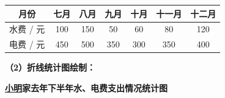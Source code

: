 \vspace{0.2cm}
\begin{center}
\renewcommand{\arraystretch}{1.5}
\begin{tabular}{c|c|c|c|c|c|c}
\toprule[1.2pt]
月份 & 七月 & 八月 & 九月 & 十月 & 十一月 & 十二月 \\
\hline
水费 / 元 & 100 & 150 & 50 & 60 & 80 & 120 \\
\hline
电费 / 元 & 450 & 500 & 350 & 300 & 350 & 400 \\
\bottomrule[1.2pt]
\end{tabular}
\end{center}

\vspace{0.4cm}
\textbf{（2）折线统计图绘制：}

\begin{center}
{\textbf{\large \underline{小明}家去年下半年水、电费支出情况统计图}}
\end{center}

